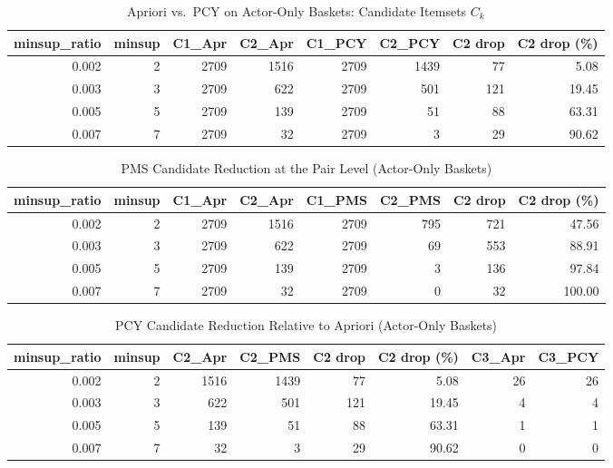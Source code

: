 \documentclass{article}  %
\begin{document}
\begin{table}[!htbp]
    \caption{Apriori vs.\ PCY on Actor-Only Baskets: Candidate Itemsets \(C_k\)}
    \centering
    \begin{tabular}{rrrrrrrr}
        \toprule
        \textbf{minsup\_ratio} & \textbf{minsup} &
        \textbf{C1\_Apr} & \textbf{C2\_Apr} &
        \textbf{C1\_PCY} & \textbf{C2\_PCY}  &\textbf{C2 drop} 
 &\textbf{C2 drop (\%)} 
\\
        \midrule
        0.002 & 2 & 2709 & 1516 & 2709 & 1439  &77 
 &5.08 
\\
        0.003 & 3 & 2709 &  622 & 2709 &  501  &121 
 &19.45 
\\
        0.005 & 5 & 2709 &  139 & 2709 &   51  &88 
 &63.31 
\\
        0.007 & 7 & 2709 &   32 & 2709 &    3  &29  &90.62 \\
        \bottomrule
    \end{tabular}
    \label{tab:10actors_Ck_apr_pcy}
\end{table}
\begin{table}[!htbp]
    \caption{PMS Candidate Reduction at the Pair Level (Actor-Only Baskets)}
    \centering
    \begin{tabular}{rrrrrrrr}
        \toprule
        \textbf{minsup\_ratio} & \textbf{minsup} &
         \textbf{C1\_Apr} 
&\textbf{C2\_Apr} &  \textbf{C1\_PMS}&\textbf{C2\_PMS} &
        \textbf{C2 drop} & \textbf{C2 drop (\%)} \\
        \midrule
        0.002 & 2 &  2709 
&1516 &  2709 
&795 & 721 & 47.56 \\
        0.003 & 3 &   2709 
&622 &   2709 
&69 & 553 & 88.91 \\
        0.005 & 5 &   2709 
&139 &    2709 
&3 & 136 & 97.84 \\
        0.007 & 7 &    2709 &32 &    2709 &0 &  32 & 100.00 \\
        \bottomrule
    \end{tabular}
    \label{tab:11pms_c2_drop}
\end{table}

\begin{table}[!htbp]
     \caption{PCY Candidate Reduction Relative to Apriori (Actor-Only Baskets)}
    \centering
    \begin{tabular}{rrrrrrrr}
        \toprule
        \textbf{minsup\_ratio} & \textbf{minsup} &
        \textbf{C2\_Apr} & \textbf{C2\_PMS}& \textbf{C2 drop} & \textbf{C2 drop (\%)} &
        \textbf{C3\_Apr} & \textbf{C3\_PCY} \\
        \midrule
        0.002 & 2 & 1516 & 1439 &  77 &  5.08 & 26 & 26 \\
        0.003 & 3 &  622 &  501 & 121 & 19.45 &  4 &  4 \\
        0.005 & 5 &  139 &   51 &  88 & 63.31 &  1 &  1 \\
        0.007 & 7 &   32 &    3 &  29 & 90.62 &  0 &  0 \\
        \bottomrule
    \end{tabular}
    \label{tab:12pcy_candidate_reduction}
\end{table}
\end{document}
